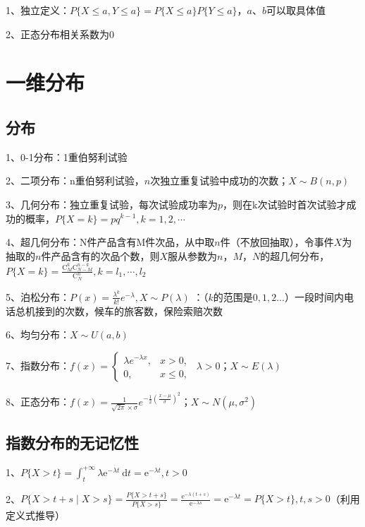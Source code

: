 1、独立定义：$P\{X \le a, Y \le a\} = P\{X \le a\}P\{Y \le a\}$，$a$、$b$可以取具体值

2、正态分布相关系数为0

\section{一维分布}



\subsection{分布}

1、0-1分布：1重伯努利试验

2、二项分布：n重伯努利试验，$n$次独立重复试验中成功的次数；$X \sim B(n,p)$

3、几何分布：独立重复试验，每次试验成功率为$p$，则在k次试验时首次试验才成功的概率，$P\{X=k\}=p q^{k-1}, k=1,2, \cdots$

4、超几何分布：N件产品含有M件次品，从中取$n$件（不放回抽取），令事件$X$为抽取的$n$件产品含有的次品个数，则$X$服从参数为$n$，$M$，$N$的超几何分布，$P\{X=k\}=\frac{\mathrm{C}_{M}^{k} \mathrm{C}_{N-M}^{n-k}}{\mathrm{C}_{N}^{n}}, k=l_{1}, \cdots, l_{2}$

5、泊松分布：$P(x) = \frac{\lambda^k}{k!}e^{-\lambda},X \sim P(\lambda)$ ：（$k$的范围是$0,1,2...$）一段时间内电话总机接到的次数，候车的旅客数，保险索赔次数

6、均匀分布：$X \sim U(a,b)$

7、指数分布：$f(x) = \begin{cases} \lambda e^{-\lambda x}, & x > 0, \\[5ex] 0, & x \le 0, \end{cases} \ \ \lambda >0$；$X \sim E(\lambda)$

8、正态分布：$f(x)=\frac{1}{\sqrt{{2\pi}}\times\sigma}e^{-\frac{1}{2}(\frac{x-\mu}{\sigma})^2}$；$X \sim N(\mu,\sigma^2)$



\subsection{指数分布的无记忆性}

1、$P\{X>t\}=\int_{t}^{+\infty} \lambda \mathrm{e}^{-\lambda t} \mathrm{~d} t=\mathrm{e}^{-\lambda t}, t>0$

2、$P\{X>t+s \mid X>s\}=\frac{P\{X>t+s\}}{P\{X>s\}}=\frac{\mathrm{e}^{-\lambda(t+s)}}{\mathrm{e}^{-\lambda s}}=\mathrm{e}^{-\lambda t}=P\{X>t\}, t, s>0$（利用定义式推导）

